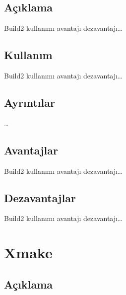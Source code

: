 \documentclass[
]{book}
\begin{document}
\hypertarget{auxe7ux131klama-8}{%
\section*{Açıklama}\label{auxe7ux131klama-8}}

Build2 kullanımı avantajı dezavantajı\ldots{}

\hypertarget{kullanux131m-7}{%
\section*{Kullanım}\label{kullanux131m-7}}

Build2 kullanımı avantajı dezavantajı\ldots{}

\hypertarget{ayrux131ntux131lar-7}{%
\section*{Ayrıntılar}\label{ayrux131ntux131lar-7}}

\ldots{}

\hypertarget{avantajlar-7}{%
\section*{Avantajlar}\label{avantajlar-7}}

Build2 kullanımı avantajı dezavantajı\ldots{}

\hypertarget{dezavantajlar-7}{%
\section*{Dezavantajlar}\label{dezavantajlar-7}}

Build2 kullanımı avantajı dezavantajı\ldots{}

\hypertarget{xmake}{%
\chapter*{Xmake}\label{xmake}}

\hypertarget{auxe7ux131klama-9}{%
\section*{Açıklama}\label{auxe7ux131klama-9}}
\end{document}
